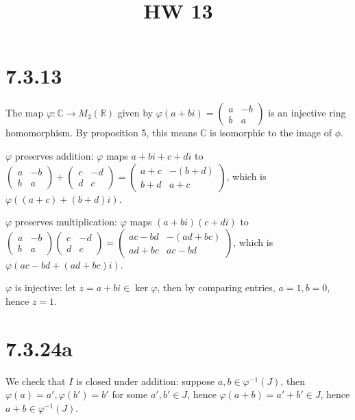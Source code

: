 \documentclass{article}
\title{HW 13}
\date{}
\def\R{\mathbb{R}}
\def\C{\mathbb{C}}
\def\inv{{-1}}
\def\vphi{\varphi}
\begin{document}
\maketitle

\section*{7.3.13}

The map $\varphi : \C \to M_2(\R)$ given by $\varphi(a + bi) = \begin{pmatrix} a & -b \\ b & a \end{pmatrix}$ is an injective ring homomorphism. By proposition 5, this means $\C$ is isomorphic to the image of $\phi$.

$\varphi$ preserves addition: $\varphi$ maps $a + bi + c + di$ to $\begin{pmatrix} a & -b \\ b & a \end{pmatrix} + \begin{pmatrix} c & -d \\ d & c \end{pmatrix} = \begin{pmatrix} a + c & -(b + d) \\ b + d & a + c \end{pmatrix}$, which is $\varphi((a + c) + (b + d)i)$.

$\varphi$ preserves multiplication: $\varphi$ maps $(a + bi)(c + di)$ to $\begin{pmatrix} a & -b \\ b & a \end{pmatrix} \begin{pmatrix} c & -d \\ d & c \end{pmatrix} = \begin{pmatrix} ac - bd & -(ad + bc) \\ ad + bc & ac - bd \end{pmatrix}$, which is $\varphi(ac - bd + (ad + bc)i)$.

$\varphi$ is injective: let $z = a + bi \in \ker \varphi$, then by comparing entries, $a = 1, b = 0$, hence $z = 1$.

\section*{7.3.24a}

We check that $I$ is closed under addition: suppose $a, b \in \vphi^\inv(J)$, then $\vphi(a) = a', \vphi(b') = b'$ for some $a', b' \in J$, hence $\vphi(a + b) = a' + b' \in J$, hence $a + b \in \vphi^\inv(J)$.
\end{document}
